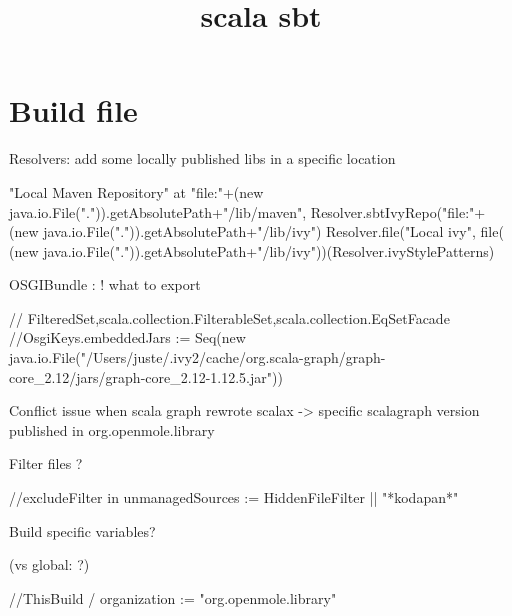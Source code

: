 


\title{scala sbt}


\date{}


\maketitle

\justify

\renewcommand{\abstractname}{}

\begin{abstract}

\end{abstract}



\section*{Build file}


Resolvers: add some locally published libs in a specific location

"Local Maven Repository" at "file:"+(new java.io.File(".")).getAbsolutePath+"/lib/maven",
 Resolver.sbtIvyRepo("file:"+(new java.io.File(".")).getAbsolutePath+"/lib/ivy")
 Resolver.file("Local ivy", file( (new java.io.File(".")).getAbsolutePath+"/lib/ivy"))(Resolver.ivyStylePatterns)


OSGIBundle : ! what to export

  // FilteredSet,scala.collection.FilterableSet,scala.collection.EqSetFacade
  //OsgiKeys.embeddedJars := Seq(new java.io.File("/Users/juste/.ivy2/cache/org.scala-graph/graph-core_2.12/jars/graph-core_2.12-1.12.5.jar"))

Conflict issue when scala graph rewrote scalax -> specific scalagraph version published in org.openmole.library



Filter files ?

//excludeFilter in unmanagedSources := HiddenFileFilter || "*kodapan*"


Build specific variables? 

(vs global: ?)

//ThisBuild / organization := "org.openmole.library"




%
%



